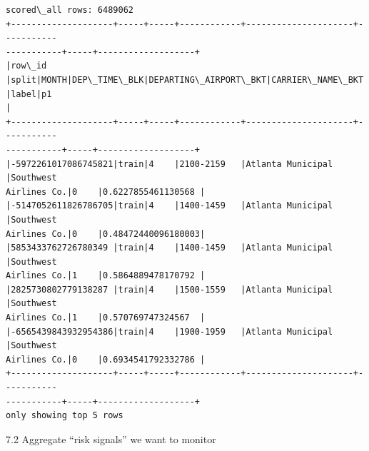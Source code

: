 \documentclass[11pt]{article}
\begin{document}
    \begin{Verbatim}[commandchars=\\\{\}]
scored\_all rows: 6489062
+--------------------+-----+-----+------------+---------------------+-----------
-----------+-----+-------------------+
|row\_id
|split|MONTH|DEP\_TIME\_BLK|DEPARTING\_AIRPORT\_BKT|CARRIER\_NAME\_BKT      |label|p1
|
+--------------------+-----+-----+------------+---------------------+-----------
-----------+-----+-------------------+
|-5972261017086745821|train|4    |2100-2159   |Atlanta Municipal    |Southwest
Airlines Co.|0    |0.6227855461130568 |
|-5147052611826786705|train|4    |1400-1459   |Atlanta Municipal    |Southwest
Airlines Co.|0    |0.48472440096180003|
|5853433762726780349 |train|4    |1400-1459   |Atlanta Municipal    |Southwest
Airlines Co.|1    |0.5864889478170792 |
|2825730802779138287 |train|4    |1500-1559   |Atlanta Municipal    |Southwest
Airlines Co.|1    |0.570769747324567  |
|-6565439843932954386|train|4    |1900-1959   |Atlanta Municipal    |Southwest
Airlines Co.|0    |0.6934541792332786 |
+--------------------+-----+-----+------------+---------------------+-----------
-----------+-----+-------------------+
only showing top 5 rows

    \end{Verbatim}

    7.2 Aggregate ``risk signals'' we want to monitor
\end{document}

